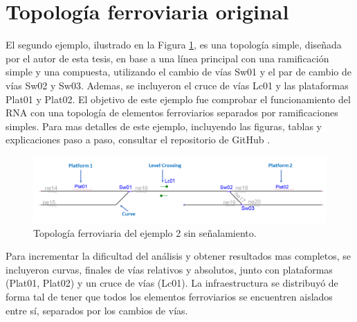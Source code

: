 \section{Topología ferroviaria original}

	El segundo ejemplo, ilustrado en la Figura \ref{fig:EJ2_1}, es una topología simple, diseñada por el autor de esta tesis, en base a una línea principal con una ramificación simple y una compuesta, utilizando el cambio de vías Sw01 y el par de cambio de vías Sw02 y Sw03. Ademas, se incluyeron el cruce de vías Lc01 y las plataformas Plat01 y Plat02. El objetivo de este ejemplo fue comprobar el funcionamiento del RNA con una topología de elementos ferroviarios separados por ramificaciones simples. Para mas detalles de este ejemplo, incluyendo las figuras, tablas y explicaciones paso a paso, consultar el repositorio de GitHub \cite{GITHUB_PHD}.
	
	\begin{figure}[H]
		\centering
		\includegraphics[width=1\textwidth]{resultados-obtenidos/ejemplo2/images/2_empty.png}
		\centering\caption{Topología ferroviaria del ejemplo 2 sin señalamiento.}
		\label{fig:EJ2_1}
	\end{figure}
	
	Para incrementar la dificultad del análisis y obtener resultados mas completos, se incluyeron curvas, finales de vías relativos y absolutos, junto con plataformas (Plat01, Plat02) y un cruce de vías (Lc01). La infraestructura se distribuyó de forma tal de tener que todos los elementos ferroviarios se encuentren aislados entre sí, separados por los cambios de vías.
